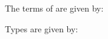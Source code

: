  







\begin{definition}[\lab]
  \label{def:lab}
  The terms of \lab are given by: \\
  \begin{grammar}{
  }
  \end{grammar}
\end{definition}


\noindent Types are given by:

\begin{grammar}{
}
\end{grammar}


